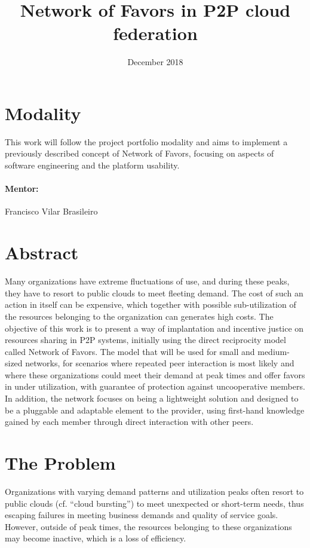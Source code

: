 \documentclass{article}
\title{Network of Favors in P2P cloud federation}
\author{Gustavo Diniz Monteiro \\ \href{gustavo.monteiro@ccc.ufcg.edu.br, gustavo.d.monteiro@icloud.com} }
\date{December 2018}
\begin{document}
\maketitle

\section{Modality}

This work will follow the project portfolio modality and aims to implement a previously described concept of Network of Favors\cite{nof}, focusing on aspects of software engineering and the platform usability.

\paragraph{Mentor:} Francisco Vilar Brasileiro

\section{Abstract}
Many organizations have extreme fluctuations of use, and during these peaks, they have to resort to public clouds to meet fleeting demand. The cost of such an action in itself can be expensive, which together with possible sub-utilization of the resources belonging to the organization can generates high costs. The objective of this work is to present a way of implantation and incentive justice on resources sharing in P2P systems, initially using the direct reciprocity model called Network of Favors. The model that will be used for small and medium-sized networks, for scenarios where repeated peer interaction is most likely and where these organizations could meet their demand at peak times and offer favors in under utilization, with guarantee of protection against uncooperative members. In addition, the network focuses on being a lightweight solution and designed to be a pluggable and adaptable element to the provider, using first-hand knowledge gained by each member through direct interaction with other peers.

\section{The Problem}
Organizations with varying demand patterns and utilization peaks often resort to public clouds (cf. “cloud bursting”\cite{cloudburst}) to meet unexpected or short-term needs, thus escaping failures in meeting business demands and quality of service goals.
However, outside of peak times, the resources belonging to these organizations may become inactive, which is a loss of efficiency.
\end{document}
